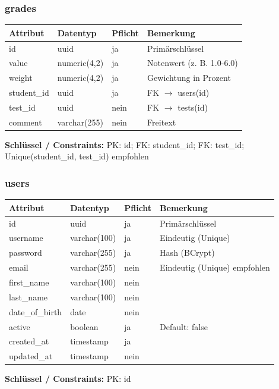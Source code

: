 \documentclass[12pt,a4paper]{article}
\begin{document}
    \subsubsection{grades}
    \begin{longtable}{|L{4cm}|L{3cm}|L{3cm}|L{4cm}|}
        \hline
        \textbf{Attribut} & \textbf{Datentyp} & \textbf{Pflicht} & \textbf{Bemerkung} \\ \hline
        id & uuid & ja & Primärschlüssel \\ \hline
        value & numeric(4,2) & ja & Notenwert (z. B. 1.0-6.0) \\ \hline
        weight & numeric(4,2) & ja & Gewichtung in Prozent \\ \hline
        student\_id & uuid & ja & FK $\rightarrow$ users(id) \\ \hline
        test\_id & uuid & nein & FK $\rightarrow$ tests(id) \\ \hline
        comment & varchar(255) & nein & Freitext \\ \hline
    \end{longtable}
    \textbf{Schlüssel / Constraints:} PK: id; FK: student\_id; FK: test\_id; Unique(student\_id, test\_id) empfohlen

    \subsubsection{users}
    \begin{longtable}{|L{4cm}|L{3cm}|L{3cm}|L{4cm}|}
        \hline
        \textbf{Attribut} & \textbf{Datentyp} & \textbf{Pflicht} & \textbf{Bemerkung} \\ \hline
        id & uuid & ja & Primärschlüssel \\ \hline
        username & varchar(100) & ja & Eindeutig (Unique) \\ \hline
        password & varchar(255) & ja & Hash (BCrypt) \\ \hline
        email & varchar(255) & nein & Eindeutig (Unique) empfohlen \\ \hline
        first\_name & varchar(100) & nein &  \\ \hline
        last\_name & varchar(100) & nein &  \\ \hline
        date\_of\_birth & date & nein &  \\ \hline
        active & boolean & ja & Default: false \\ \hline
        created\_at & timestamp & ja &  \\ \hline
        updated\_at & timestamp & nein &  \\ \hline
    \end{longtable}
    \textbf{Schlüssel / Constraints:} PK: id
\end{document}
